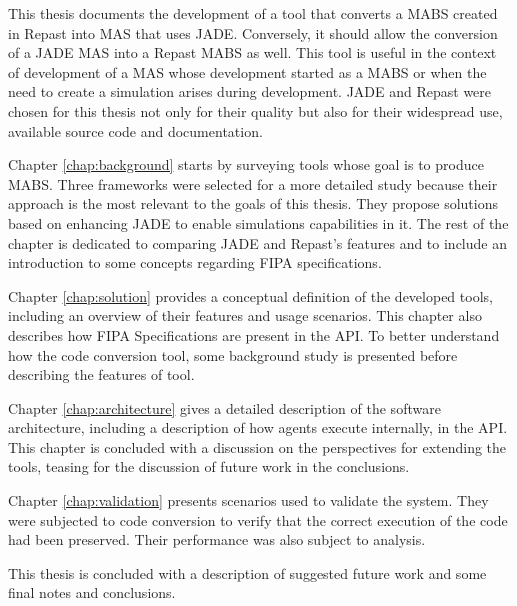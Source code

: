 This thesis documents the development of a tool that converts a MABS created in Repast into MAS that uses JADE. Conversely, it should allow the conversion of a JADE MAS into a Repast MABS as well. This tool is useful in the context of development of a MAS whose development started as a MABS or when the need to create a simulation arises during development. JADE and Repast were chosen for this thesis not only for their quality but also for their widespread use, available source code and documentation.

Chapter \ref{chap:background} starts by surveying tools whose goal is to produce MABS. Three frameworks were selected for a more detailed study because their approach is the most relevant to the goals of this thesis. They propose solutions based on enhancing JADE to enable simulations capabilities in it. The rest of the chapter is dedicated to comparing JADE and Repast's features and to include an introduction to some concepts regarding FIPA specifications.

Chapter \ref{chap:solution} provides a conceptual definition of the developed tools, including an overview of their features and usage scenarios. This chapter also describes how FIPA Specifications are present in the API. To better understand how the code conversion tool, some background study is presented before describing the features of tool.

Chapter \ref{chap:architecture} gives a detailed description of the software architecture, including a description of how agents execute internally, in the API. This chapter is concluded with a discussion on the perspectives for extending the tools, teasing for the discussion of future work in the conclusions.

Chapter \ref{chap:validation} presents scenarios used to validate the system. They were subjected to code conversion to verify that the correct execution of the code had been preserved. Their performance was also subject to analysis.

This thesis is concluded with a description of suggested future work and some final notes and conclusions.